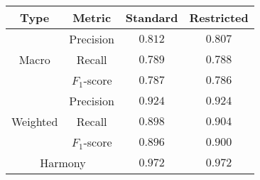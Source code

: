 \begin{tabular}{cccc}
    \textbf{Type} & \textbf{Metric} & \textbf{Standard} & \textbf{Restricted} \\\hline
    \multirow{3}{*}{Macro}    & Precision  & $0.812$ & $0.807$ \\
                              & Recall     & $0.789$ & $0.788$ \\
                              & $F_1$-score & $0.787$ & $0.786$ \\\hline
    \multirow{3}{*}{Weighted} & Precision  & $0.924$ & $0.924$ \\
                              & Recall     & $0.898$ & $0.904$ \\
                              & $F_1$-score & $0.896$ & $0.900$ \\\hline
    \multicolumn{2}{c}{Harmony} & $0.972$ & $0.972$ \\
\end{tabular}